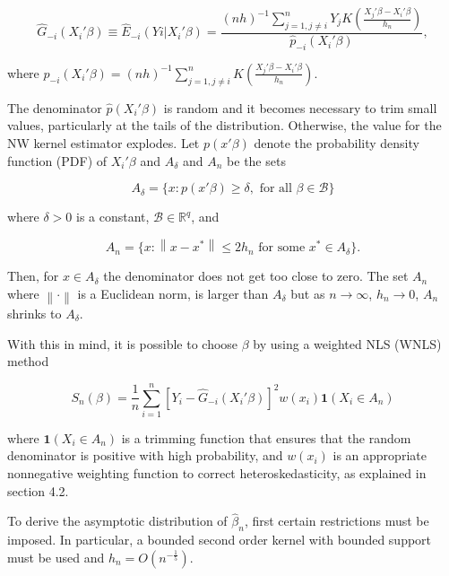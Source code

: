 \documentclass[a4paper]{article}
\newcommand{\norm}[1]{\left\lVert#1\right\rVert}
\begin{document}
\begin{equation}
\hat{G}_{-i}(X_i'\beta) \equiv \hat{E}_{-i}(Yi|X_i'\beta) = \frac{(nh)^{-1}\sum_{j=1, j \neq i }^{n}  Y_jK(\frac{X_j'\beta - X_i'\beta}{h_n})}{\hat{p}_{-i}(X_i'\beta)},
\end{equation}

where $\hat{p}_{-i}(X_i'\beta) = (nh)^{-1}\sum_{j=1,j \neq i}^{n}K(\frac{X_j'\beta - X_i'\beta}{h_n})$.  

The denominator $\hat{p}(X_i'\beta)$ is random and it becomes necessary to trim small values, particularly at the tails of the distribution. Otherwise, the value for the NW kernel estimator explodes. Let $p(x'\beta)$ denote the probability density function (PDF) of $X_i'\beta$ and $A_\delta$ and $A_n$ be the sets

\[ A_\delta = \{ x : p(x'\beta) \geq \delta, \text{ for all }  \beta \in \mathcal{B} \}
\]

where $\delta > 0$ is a constant, $\mathcal{B} \in \mathbb{R}^q$, and

\[ A_n = \{ x : \norm{x - x^*} \leq 2h_n \text{ for some } x^* \in A_\delta\}.
\]

Then, for $x \in A_\delta$ the denominator does not get too close to zero. The set $A_n$ where $\norm{\cdot}$ is a Euclidean norm, is larger than $A_\delta$ but as $ n \rightarrow \infty $, $h_n \rightarrow 0$, $A_n$ shrinks to $A_\delta$. 

With this in mind, it is possible to choose $\beta$ by using a weighted NLS (WNLS) method

\begin{equation}
S_n(\beta) = \frac{1}{n} \sum_{i=1}^{n}  [Y_i - \hat{G}_{-i}(X_i'\beta)]^2w(x_i)\mathbf{1}{(X_i \in A_n)}
\end{equation}

where $\mathbf{1}{(X_i \in A_n)}$ is a trimming function that ensures that the random denominator is positive with high probability, and $w(x_i)$ is an appropriate nonnegative weighting function to correct heteroskedasticity, as explained in section 4.2. 

To derive the asymptotic distribution of $\hat{\beta}_n$, first certain restrictions must be imposed. In particular, a bounded second order kernel with bounded support must be used and $ h_n = O(n^{-\frac{1}{5}})$.

\newtheorem{theorem}{Theorem}[section]
\end{document}
